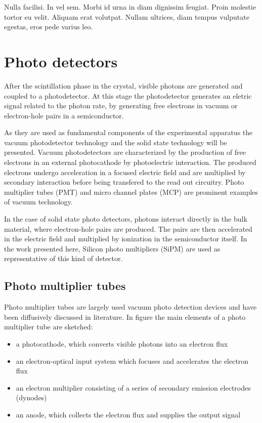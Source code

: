 \begin{savequote}[75mm] 
Nulla facilisi. In vel sem. Morbi id urna in diam dignissim feugiat. Proin molestie tortor eu velit. Aliquam erat volutpat. Nullam ultrices, diam tempus vulputate egestas, eros pede varius leo.
\end{savequote}


\chapter{Photo detectors}
After the scintillation phase in the crystal, visible photons are generated and coupled to a photodetector. At this stage the photodetector generates an eletric signal related to the photon rate, by generating free electrons in vacuum or electron-hole pairs in a semiconductor.

As they are used as fundamental components of the experimental apparatus the vacuum photodetector technology and the solid state technology will be presented.
Vacuum photodetectors are characterized by the production of free electrons in an external photocathode by photoelectric interaction. The produced electrons undergo acceleration in a focused electric field and are multiplied by secondary interaction before being transfered to the read out circuitry. Photo multiplier tubes (PMT) and micro channel plates (MCP) are prominent examples of vacuum technology.
  
In the case of solid state photo detectors, photons interact directly in the bulk material, where electron-hole pairs are produced. The pairs are then accelerated in the electric field and multiplied by ionization in the semiconductor itself. In the work presented here, Silicon photo multipliers (SiPM) are used as representative of this kind of detector.     

\section{Photo multiplier tubes}

Photo multiplier tubes are largely used vacuum photo detection devices and have been diffusively discussed in literature. %
In figure 
the main elements of a photo multiplier tube are sketched:


\begin{itemize}
\item a photocathode, which converts visible photons into an electron flux
\item an electron-optical input system which focuses and accelerates the electron flux
\item an electron multiplier consisting of a series of secondary emission electrodes (dynodes)
\item an anode, which collects the electron flux and supplies the output signal
\end{itemize}

